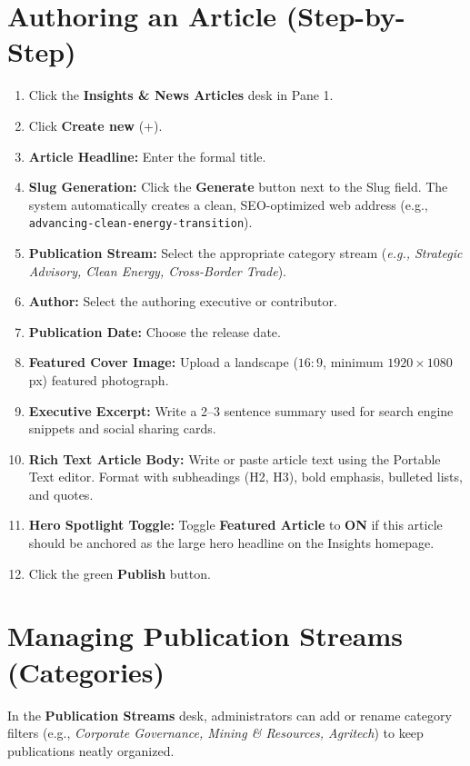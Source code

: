 \documentclass[11pt,a4paper,oneside]{book}
\begin{document}
\section{Authoring an Article (Step-by-Step)}
\begin{enumerate}[leftmargin=*,label=\textbf{Step \arabic*:}]
  \item Click the \textbf{Insights \& News Articles} desk in Pane 1.
  \item Click \textbf{Create new} (+).
  \item \textbf{Article Headline:} Enter the formal title.
  \item \textbf{Slug Generation:} Click the \textbf{Generate} button next to the Slug field. The system automatically creates a clean, SEO-optimized web address (e.g., \texttt{advancing-clean-energy-transition}).
  \item \textbf{Publication Stream:} Select the appropriate category stream (\textit{e.g., Strategic Advisory, Clean Energy, Cross-Border Trade}).
  \item \textbf{Author:} Select the authoring executive or contributor.
  \item \textbf{Publication Date:} Choose the release date.
  \item \textbf{Featured Cover Image:} Upload a landscape ($16:9$, minimum $1920\times1080$px) featured photograph.
  \item \textbf{Executive Excerpt:} Write a 2--3 sentence summary used for search engine snippets and social sharing cards.
  \item \textbf{Rich Text Article Body:} Write or paste article text using the Portable Text editor. Format with subheadings (H2, H3), bold emphasis, bulleted lists, and quotes.
  \item \textbf{Hero Spotlight Toggle:} Toggle \textbf{Featured Article} to \textbf{ON} if this article should be anchored as the large hero headline on the Insights homepage.
  \item Click the green \textbf{Publish} button.
\end{enumerate}

\section{Managing Publication Streams (Categories)}
In the \textbf{Publication Streams} desk, administrators can add or rename category filters (e.g., \textit{Corporate Governance, Mining \& Resources, Agritech}) to keep publications neatly organized.
\end{document}
